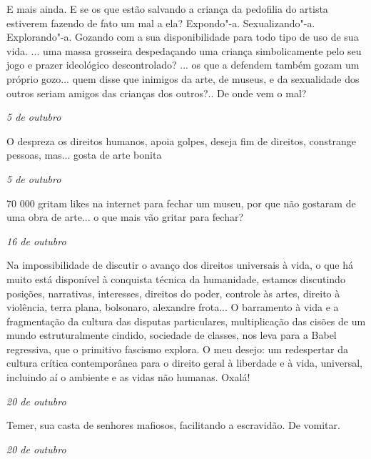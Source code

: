 E mais ainda. E se os que estão salvando a criança da pedofilia do
artista estiverem fazendo de fato um mal a ela? Expondo"-a.
Sexualizando"-a. Explorando"-a. Gozando com a sua disponibilidade para
todo tipo de uso de sua vida. ... uma massa grosseira despedaçando uma
criança simbolicamente pelo seu jogo e prazer ideológico descontrolado?
... os que a defendem também gozam um próprio gozo... quem disse que
inimigos da arte, de museus, e da sexualidade dos outros seriam amigos
das crianças dos outros?.. De onde vem o mal?

\begin{flushright}
\emph{5 de outubro}
\end{flushright}

O  despreza os direitos humanos, apoia golpes, deseja fim de
direitos, constrange pessoas, mas... gosta de arte bonita

\begin{flushright}
\emph{5 de outubro}
\end{flushright}

70 000 gritam likes na internet para fechar um museu, por que não
gostaram de uma obra de arte... o que mais vão gritar para fechar?

\begin{flushright}
\emph{16 de outubro}
\end{flushright}

Na impossibilidade de discutir o avanço dos direitos universais à vida,
o que há muito está disponível à conquista técnica da humanidade,
estamos discutindo posições, narrativas, interesses, direitos do poder,
controle às artes, direito à violência, terra plana, bolsonaro,
alexandre frota... O barramento à vida e a fragmentação da cultura das
disputas particulares, multiplicação das cisões de um mundo
estruturalmente cindido, sociedade de classes, nos leva para a Babel
regressiva, que o primitivo fascismo explora. O meu desejo: um
redespertar da cultura crítica contemporânea para o direito geral à
liberdade e à vida, universal, incluindo aí o ambiente e as vidas não
humanas. Oxalá!

\begin{flushright}
\emph{20 de outubro}
\end{flushright}

Temer, sua casta de senhores mafiosos, facilitando a escravidão. De
vomitar.

\begin{flushright}
\emph{20 de outubro}
\end{flushright}

